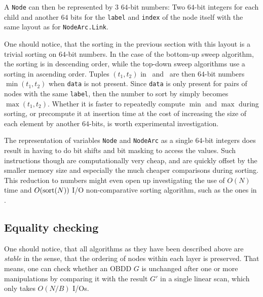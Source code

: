 A \lstinline{Node} can then be represented by $3$ $64$-bit numbers: Two $64$-bit
integers for each child and another $64$ bits for the \lstinline{label} and
\lstinline{index} of the node itself with the same layout as for
\lstinline{NodeArc.Link}.

One should notice, that the sorting in the previous section with this layout is
a trivial sorting on $64$-bit numbers. In the case of the bottom-up sweep
algorithm, the sorting is in descending order, while the top-down sweep
algorithms use a sorting in ascending order. Tuples $(t_1,t_2)$ in \Apply\ and
\Equal\ are then $64$-bit numbers $\min(t_1,t_2)$ when \lstinline{data} is not
present. Since \lstinline{data} is only present for pairs of nodes with the same
\lstinline{label}, then the number to sort by simply becomes $\max(t_1,t_2)$.
Whether it is faster to repeatedly compute $\min$ and $\max$ during sorting, or
precompute it at insertion time at the cost of increasing the size of each
element by another $64$-bits, is worth experimental investigation.

The representation of variables \lstinline{Node} and \lstinline{NodeArc} as a
single $64$-bit integers does result in having to do bit shifts and bit masking
to access the values. Such instructions though are computationally very cheap,
and are quickly offset by the smaller memory size and especially the much
cheaper comparisons during sorting. This reduction to numbers might even open up
investigating the use of $O(N)$ time and $O(\text{sort}(N))$ I/O non-comparative sorting
algorithm, such as the ones in \todocite.

\subsection{Equality checking}
One should notice, that all algorithms as they have been described above are
\emph{stable} in the sense, that the ordering of nodes within each layer is
preserved. That means, one can check whether an OBDD $G$ is unchanged after one
or more manipulations by comparing it with the result $G'$ in a single linear
scan, which only takes $O(N/B)$ I/Os.

